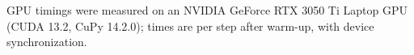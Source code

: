 GPU timings were measured on an NVIDIA GeForce RTX 3050 Ti Laptop GPU (CUDA 13.2, CuPy 14.2.0); times are per step after warm-up, with device synchronization.
